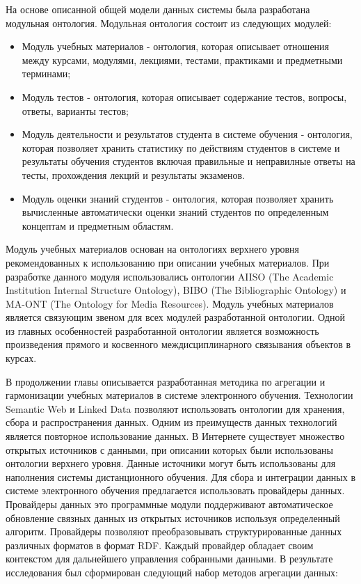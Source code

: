 На основе описанной общей модели данных системы была разработана модульная онтология. Модульная онтология состоит из следующих модулей:


\begin{itemize}
\item Модуль учебных материалов - онтология, которая описывает отношения между курсами, модулями, лекциями, тестами, практиками и предметными терминами;
\item Модуль тестов - онтология, которая описывает содержание тестов, вопросы, ответы, варианты тестов;
\item Модуль деятельности и результатов студента в системе обучения - онтология, которая позволяет хранить статистику по действиям студентов в системе и результаты обучения студентов включая правильные и неправилные ответы на тесты, прохождения лекций и результаты экзаменов.
\item Модуль оценки знаний студентов - онтология, которая позволяет хранить вычисленные автоматически оценки знаний студентов по определенным концептам и предметным областям.
\end{itemize}

Модуль учебных материалов основан на онтологиях верхнего уровня рекомендованных к использованию при описании учебных материалов. При разработке данного модуля использовались онтологии AIISO (The Academic Institution Internal Structure Ontology), BIBO (The Bibliographic Ontology) и MA-ONT (The Ontology for Media Resources). Модуль учебных материалов является связующим звеном для всех модулей разработанной онтологии. Одной из главных особенностей разработанной онтологии является возможность произведения прямого и косвенного междисциплинарного связывания объектов в курсах.   


В продолжении главы описывается разработанная методика по агрегации и гармонизации учебных материалов в системе электронного обучения. Технологии Semantic Web и Linked Data позволяют использовать онтологии для хранения, сбора и распространения данных. Одним из преимуществ данных технологий является повторное использование данных. В Интернете существует множество открытых источников с данными, при описании которых были использованы онтологии верхнего уровня. Данные источники могут быть использованы для наполнения системы дистанционного обучения. Для сбора и интеграции данных в системе электронного обучения предлагается использовать провайдеры данных. Провайдеры данных это программные модули  поддерживают автоматическое обновление связных данных из открытых источников используя определенный алгоритм. Провайдеры позволяют преобразовывать структурированные данных различных форматов в формат RDF. Каждый провайдер обладает своим контекстом для дальнейшего управления собранными данными. В результате исследования был сформирован следующий набор методов агрегации данных:

